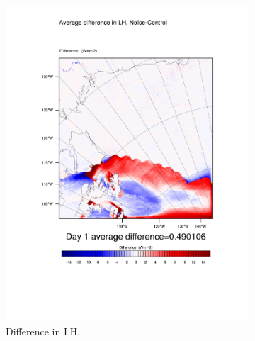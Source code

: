 \begin{figure}
\centering
	\begin{subfigure}{0.48\textwidth}
		\includegraphics[width=\textwidth]{results/noice/diff_NoIce_LH_Day1.pdf}
		\caption{Difference in LH.}
		\label{subfig:lh_r2Day1}
	\end{subfigure}
	\quad
		\begin{subfigure}{0.48\textwidth}

\end{subfigure}
\end{figure}
